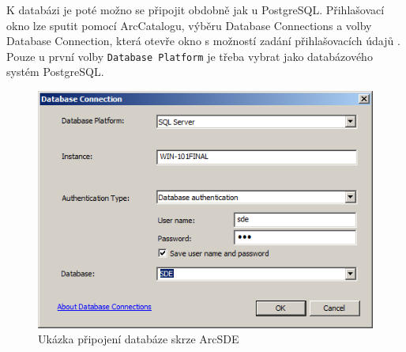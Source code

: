 K databázi je poté možno se připojit obdobně jak u PostgreSQL. Přihlašovací
okno lze sputit pomocí ArcCatalogu, výběru Database Connections a volby
Database Connection, která otevře okno s možností zadání
přihlašovacích údajů . Pouze u první volby \texttt{Database Platform} je třeba vybrat jako databázového systém PostgreSQL. 

  \begin{figure}[H]
    \centering
    \includegraphics[scale=0.5]{../../../grafy/obr/conectScreen.png}
    \caption {Ukázka připojení databáze skrze ArcSDE}
          \label{connect}
  \end{figure}

